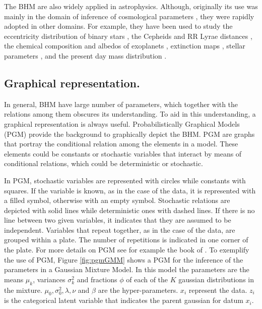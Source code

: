 The BHM are also widely applied in astrophysics. Although, originally its use was mainly in the domain of inference of cosmological parameters \cite[see for example the works of][]{Feeney2013,March2014,Anderes2015,Shariff2016,Alsing2017}, they were rapidly adopted in other domains. For example, they have been used to study the eccentricity distribution of binary stars \citet{Hogg2010}, the Cepheids \citep{Barnes2004} and RR Lyrae distances \citep{Jefferys2007}, the chemical composition \citep{Wolfgang2015} and albedos of exoplanets \citep{Demory2014}, extinction maps \citep{Sale2012}, stellar parameters \citep{Shkedy2007}, and the present day mass distribution \citep{Tapiador2017}.

\subsection{Graphical representation.}
In general, BHM have large number of parameters, which together with the relations among them obscures its understanding. To aid in this understanding, a graphical representation is always useful. Probabilistically Graphical Models (PGM) provide the background to graphically depict the BHM. PGM are graphs that portray the conditional relation among the elements in a model. These elements could be constants or stochastic variables that interact by means of conditional relations, which could be deterministic or stochastic. 

In PGM, stochastic variables are represented with circles while constants with squares. If the variable is known, as in the case of the data, it is represented with a filled symbol, otherwise with an empty symbol. Stochastic relations are depicted with solid lines while deterministic ones with dashed lines. If there is no line between two given variables, it indicates that they are assumed to be independent. Variables that repeat together, as in the case of the data, are grouped within a plate. The number of repetitions is indicated in one corner of the plate. For more details on PGM see for example the book of \citet{Koller2009}. To exemplify the use of PGM, Figure \ref{fig:pgmGMM} shows a PGM for the inference of the parameters in a Gaussian Mixture Model. In this model the parameters are the means $\mu_k$, variances $\sigma_k^2$ and fractions $\phi$ of each of the $K$ gaussian distributions in the mixture. $\mu_0,\sigma_0^2,\lambda,\nu$ and $\beta$ are the hyper-parameters. $x_i$ represent the data. $z_i$ is the categorical latent variable that indicates the parent gaussian for datum $x_i$.

